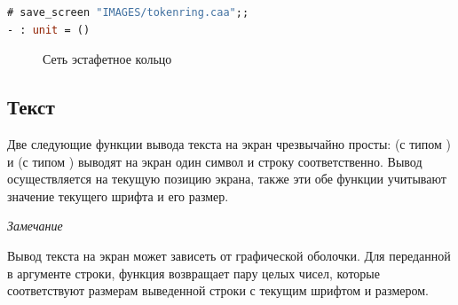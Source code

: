 \begin{lstlisting}[language=OCaml]
# save_screen "IMAGES/tokenring.caa";;
- : unit = ()
\end{lstlisting}

\begin{figure}[h]
	\caption{\label{fig:token_ring_network}Сеть эстафетное кольцо}
\end{figure}

\subsection{Текст}
\label{subsec:text}

Две следующие функции вывода текста на экран чрезвычайно просты: 
 (с типом ) и  (с типом 
) выводят на экран один символ и строку соответственно. 
Вывод осуществляется на текущую позицию экрана, также эти обе функции учитывают 
значение текущего шрифта и его размер.

{\it Замечание}

Вывод текста на экран может зависеть от графической оболочки.
Для переданной в аргументе строки, функция  возвращает пару 
целых чисел, которые соответствуют размерам выведенной строки с текущим шрифтом 
и размером.

